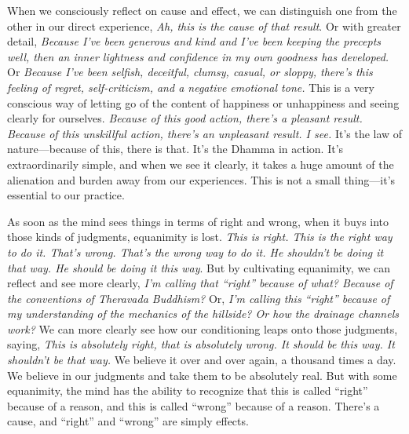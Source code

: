 When we consciously reflect on cause and effect, we can distinguish one 
from the other in our direct experience, \emph{Ah, this is the cause of 
that result}. Or with greater detail, \emph{Because I've been generous 
and kind and I've been keeping the precepts well, then an inner 
lightness and confidence in my own goodness has developed.} Or 
\emph{Because I've been selfish, deceitful, clumsy, casual, or sloppy, 
there's this feeling of regret, self-criticism, and a negative 
emotional tone.} This is a very conscious way of letting go of the 
content of happiness or unhappiness and seeing clearly for ourselves. 
\emph{Because of this good action, there's a pleasant result. Because 
of this unskillful action, there's an unpleasant result. I see.} It's 
the law of nature---because of this, there is that. It's the Dhamma in 
action. It's extraordinarily simple, and when we see it clearly, it 
takes a huge amount of the alienation and burden away from our 
experiences. This is not a small thing---it's essential to our practice.

As soon as the mind sees things in terms of right and wrong, when it 
buys into those kinds of judgments, equanimity is lost. \emph{This is 
right. This is the right way to do it. That's wrong. That's the wrong 
way to do it. He shouldn't be doing it that way. He should be doing it 
this way}. But by cultivating equanimity, we can reflect and see more 
clearly, \emph{I'm calling that ``right'' because of what? Because of 
the conventions of Theravada Buddhism?} Or, \emph{I'm calling this 
``right'' because of my understanding of the mechanics of the hillside? 
Or how the drainage channels work?} We can more clearly see how our 
conditioning leaps onto those judgments, saying, \emph{This is 
absolutely right, that is absolutely wrong. It should be this way. It 
shouldn't be that way.} We believe it over and over again, a thousand 
times a day. We believe in our judgments and take them to be absolutely 
real. But with some equanimity, the mind has the ability to recognize 
that this is called ``right'' because of a reason, and this is called 
``wrong'' because of a reason. There's a cause, and ``right'' and 
``wrong'' are simply effects.

